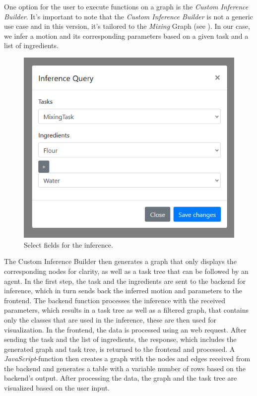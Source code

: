 One option for the user to execute functions on a graph is the \textit{Custom Inference Builder}. 
It's important to note that the \textit{Custom Inference Builder} is not a generic use case and in this version, it's tailored to the \textit{Mixing} Graph (see ). 
In our case, we infer a motion and its corresponding parameters based on a given task and a list of ingredients. 
\begin{figure}[H]
    \includegraphics[scale=0.45]{Graphics/inference_user_input.png}
    \caption{Select fields for the inference.}
\end{figure}
The Custom Inference Builder then generates a graph that only displays the corresponding nodes for clarity, as well as a task tree that can be followed by an agent.
In the first step, the task and the ingredients are sent to the backend for inference, which in turn sends back the inferred motion and parameters to the frontend.
The backend function processes the inference with the received parameters, which results in a task tree as well as a filtered graph, that contains only the classes that are used in the inference, these are then used for visualization.
In the frontend, the data is processed using an web request. After sending the task and the list of ingredients, the response, which includes the generated graph and task tree, is returned to the frontend and processed. A \textit{JavaScript}-function then creates a graph with the nodes and edges received from the backend and generates a table with a variable number of rows based on the backend's output.
After processing the data, the graph and the task tree are visualized based on the user input.


